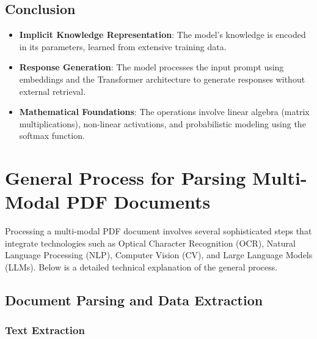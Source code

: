 \documentclass[12pt]{article}
\begin{document}
\subsection{Conclusion}

\begin{itemize}
    \item \textbf{Implicit Knowledge Representation}: The model's knowledge is encoded in its parameters, learned from extensive training data.
    \item \textbf{Response Generation}: The model processes the input prompt using embeddings and the Transformer architecture to generate responses without external retrieval.
    \item \textbf{Mathematical Foundations}: The operations involve linear algebra (matrix multiplications), non-linear activations, and probabilistic modeling using the softmax function.
\end{itemize}





\section{General Process for Parsing Multi-Modal PDF Documents}

Processing a multi-modal PDF document involves several sophisticated steps that integrate technologies such as Optical Character Recognition (OCR), Natural Language Processing (NLP), Computer Vision (CV), and Large Language Models (LLMs). Below is a detailed technical explanation of the general process.

\subsection{Document Parsing and Data Extraction}

\subsubsection{Text Extraction}
\end{document}
